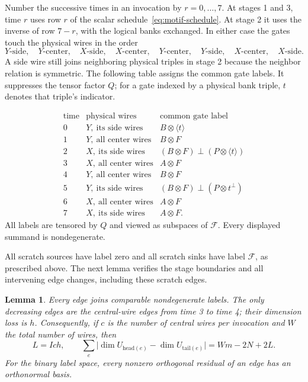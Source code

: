 \documentclass[11pt]{article}
\newtheorem{lemma}[theorem]{Lemma}
\theoremstyle{definition}
\begin{document}
Number the successive times in an invocation by
$r=0,\ldots,7$. At stages 1 and 3, time $r$ uses row $r$ of the scalar
schedule~\eqref{eq:motif-schedule}. At stage 2 it uses the inverse of
row $7-r$, with the logical banks exchanged. In either case the gates
touch the physical wires in the order
\[
 Y\text{-side},\quad Y\text{-center},\quad X\text{-side},\quad
 X\text{-center},\quad Y\text{-center},\quad Y\text{-side},\quad
 X\text{-center},\quad X\text{-side}.
\]
A side wire still joins neighboring physical triples in stage 2 because
the neighbor relation is symmetric. The following table assigns the
common gate labels. It suppresses the tensor factor $Q$; for a gate
indexed by a physical bank triple, $t$ denotes that triple's indicator.

\begin{equation}
\begin{array}{c|l|l}
\text{time}&\text{physical wires}&\text{common gate label}\\ \hline
0&Y,\ \text{its side wires}&B\otimes\langle t\rangle\\
1&Y,\ \text{all center wires}&B\otimes F\\
2&X,\ \text{its side wires}&(B\otimes F)\mathbin{\perp}(P\otimes\langle t\rangle)\\
3&X,\ \text{all center wires}&A\otimes F\\
4&Y,\ \text{all center wires}&B\otimes F\\
5&Y,\ \text{its side wires}&(B\otimes F)\mathbin{\perp}(P\otimes t^\perp)\\
6&X,\ \text{all center wires}&A\otimes F\\
7&X,\ \text{its side wires}&A\otimes F.
\end{array}
\label{eq:motif-labels}
\end{equation}
All labels are tensored by $Q$ and viewed as subspaces of $\mathcal F$.
Every displayed summand is nondegenerate.

All scratch sources have label zero and all scratch sinks have label
$\mathcal F$, as prescribed above. The next lemma verifies the stage
boundaries and all intervening edge changes, including these scratch
edges.

\begin{lemma}\label{lem:motif-residuals}
Every edge joins comparable nondegenerate labels.  The only decreasing
edges are the central-wire edges from time 3 to time 4; their dimension
loss is $h$.  Consequently, if $c$ is the number of central wires per
invocation and $W$ the total number of wires, then
\begin{equation}
 L=Ich,\qquad
 \sum_{e}\bigl|\dim U_{\mathrm{head}(e)}-
                       \dim U_{\mathrm{tail}(e)}\bigr|
 =Wm-2N+2L.                                      \label{eq:rank-budget-labels}
\end{equation}
For the binary label space, every nonzero orthogonal residual of an
edge has an orthonormal basis.
\end{lemma}
\end{document}
